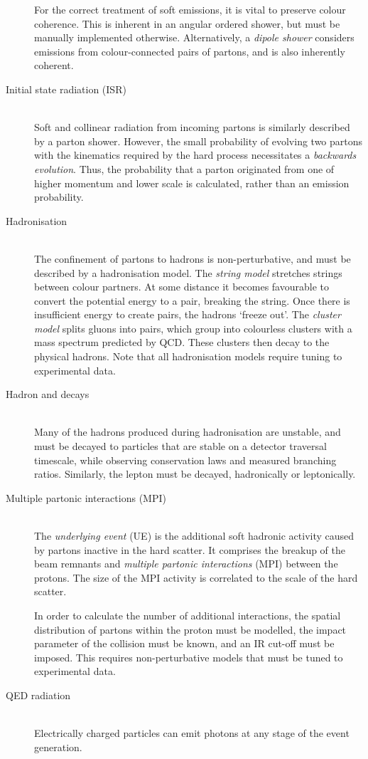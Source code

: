 \begin{description}
	For the correct treatment of soft emissions, it is vital to preserve colour 
	coherence. This is inherent in an angular ordered shower, but must be manually 
	implemented otherwise. Alternatively, a \textit{dipole shower} considers emissions 
	from colour-connected pairs of partons, and is also inherently coherent.
\item[Initial state radiation (ISR)] \hfill \\
	Soft and collinear radiation from incoming partons is similarly described by a parton 
	shower. However, the small probability of evolving two partons with the kinematics 
	required by the hard process necessitates a \textit{backwards evolution}. Thus, the 
	probability that a parton originated from one of higher momentum and lower scale is 
	calculated, rather than an emission probability.
\item[Hadronisation] \hfill \\
	The confinement of partons to hadrons is non-perturbative, and must be described by a 
	hadronisation model. The \textit{string model} stretches strings between colour 
	partners. At some distance it becomes favourable to convert the potential energy to a 
	\HepProcess{\Pquark \APquark} pair, breaking the string. Once there is insufficient 
	energy to create \HepProcess{\Pquark \APquark} pairs, the hadrons `freeze out'. The 
	\textit{cluster model} splits gluons into \HepProcess{\Pquark \APquark} pairs, which 
	group into colourless clusters with a mass spectrum predicted by \ac{QCD}. These 
	clusters then decay to the physical hadrons. Note that all hadronisation models 
	require tuning to experimental data.
\item[Hadron and \Ptau decays] \hfill \\
	Many of the hadrons produced during hadronisation are unstable, and must be decayed to
	particles that are stable on a detector traversal timescale, while observing 
	conservation laws and measured branching ratios. Similarly, the \Ptau lepton must be 
	decayed, hadronically or leptonically.
\item[Multiple partonic interactions (MPI)] \hfill \\
	The \textit{underlying event} (UE) is the additional soft hadronic activity caused by 
	partons inactive in the hard scatter. It comprises the breakup of the beam remnants 
	and \textit{multiple partonic interactions} (MPI) between the protons. The size of 
	the MPI activity is correlated to the scale of the hard scatter. 

	In order to calculate the number of additional interactions, the spatial distribution 
	of partons within the proton must be modelled, the impact parameter of the \pp 
	collision must be known, and an IR cut-off must be imposed. This requires 
	non-perturbative models that must be tuned to experimental data.
\item[\acs{QED} radiation] \hfill \\
	Electrically charged particles can emit photons at any stage of the event generation.
\end{description}



